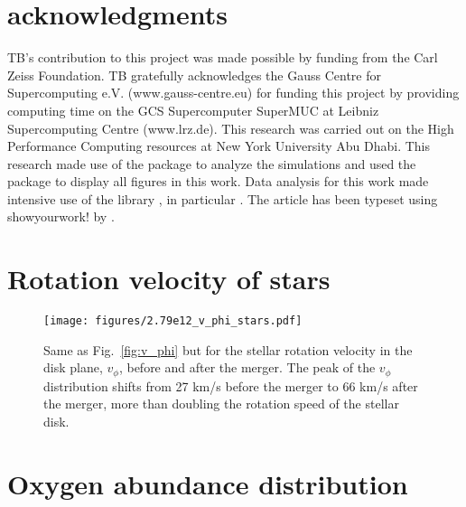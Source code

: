 \documentclass[useAMS,usenatbib]{mnras}
\begin{document}
\section*{acknowledgments}
TB's contribution to this project was made possible by funding from the Carl Zeiss Foundation. TB gratefully acknowledges the Gauss Centre for Supercomputing e.V. (www.gauss-centre.eu) for funding this project by providing computing time on the GCS Supercomputer SuperMUC at Leibniz Supercomputing Centre (www.lrz.de). This research was carried out on the High Performance Computing resources at New York University Abu Dhabi.
This research made use of the {} \citet{pynbody} package to analyze the simulations and used the {} package {} \citep{matplotlib} to display all figures in this work. Data analysis for this work made intensive use of the {} library {} \citep{scipy}, in particular {} \citep{numpy,ipython}. The article has been typeset using showyourwork! by \citet{Luger2021}.




\appendix

\section{Rotation velocity of stars}

\begin{figure}
    \begin{centering}
        \texttt{[image: figures/2.79e12\_v\_phi\_stars.pdf]}
        \caption{
            Same as Fig.~\ref{fig:v_phi} but for the stellar rotation velocity in the disk plane, $v_\phi$, before and after the merger. The peak of the $v_\phi$ distribution shifts from 27 km/s before the merger to 66 km/s after the merger, more than doubling the rotation speed of the stellar disk.
        }
        \label{fig:v_phi_stars}
    \end{centering}
\end{figure}

\section{Oxygen abundance distribution}
\end{document}
